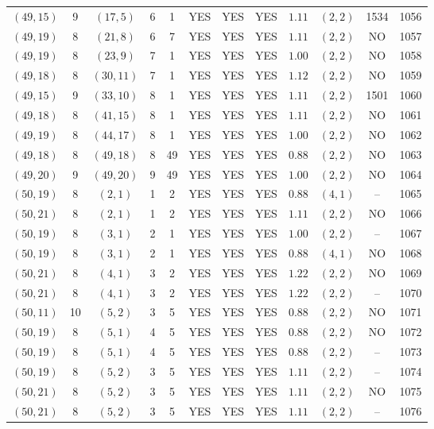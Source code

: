 \begin{longtable}{|c|c|c|c|c|c|c|c|c|c|c|c|}
$(49,15)$ & 9 & $(17,5)$ & 6 & 1 & YES & YES & YES & $1.11$ & $(2,2)$ & 1534 & 1056\\
$(49,19)$ & 8 & $(21,8)$ & 6 & 7 & YES & YES & YES & $1.11$ & $(2,2)$ & NO & 1057\\
$(49,19)$ & 8 & $(23,9)$ & 7 & 1 & YES & YES & YES & $1.00$ & $(2,2)$ & NO & 1058\\
$(49,18)$ & 8 & $(30,11)$ & 7 & 1 & YES & YES & YES & $1.12$ & $(2,2)$ & NO & 1059\\
$(49,15)$ & 9 & $(33,10)$ & 8 & 1 & YES & YES & YES & $1.11$ & $(2,2)$ & 1501 & 1060\\
$(49,18)$ & 8 & $(41,15)$ & 8 & 1 & YES & YES & YES & $1.11$ & $(2,2)$ & NO & 1061\\
$(49,19)$ & 8 & $(44,17)$ & 8 & 1 & YES & YES & YES & $1.00$ & $(2,2)$ & NO & 1062\\
$(49,18)$ & 8 & $(49,18)$ & 8 & 49 & YES & YES & YES & $0.88$ & $(2,2)$ & NO & 1063\\
$(49,20)$ & 9 & $(49,20)$ & 9 & 49 & YES & YES & YES & $1.00$ & $(2,2)$ & NO & 1064\\
$(50,19)$ & 8 & $(2,1)$ & 1 & 2 & YES & YES & YES & $0.88$ & $(4,1)$ & -- & 1065\\
$(50,21)$ & 8 & $(2,1)$ & 1 & 2 & YES & YES & YES & $1.11$ & $(2,2)$ & NO & 1066\\
$(50,19)$ & 8 & $(3,1)$ & 2 & 1 & YES & YES & YES & $1.00$ & $(2,2)$ & -- & 1067\\
$(50,19)$ & 8 & $(3,1)$ & 2 & 1 & YES & YES & YES & $0.88$ & $(4,1)$ & NO & 1068\\
$(50,21)$ & 8 & $(4,1)$ & 3 & 2 & YES & YES & YES & $1.22$ & $(2,2)$ & NO & 1069\\
$(50,21)$ & 8 & $(4,1)$ & 3 & 2 & YES & YES & YES & $1.22$ & $(2,2)$ & -- & 1070\\
$(50,11)$ & 10 & $(5,2)$ & 3 & 5 & YES & YES & YES & $0.88$ & $(2,2)$ & NO & 1071\\
$(50,19)$ & 8 & $(5,1)$ & 4 & 5 & YES & YES & YES & $0.88$ & $(2,2)$ & NO & 1072\\
$(50,19)$ & 8 & $(5,1)$ & 4 & 5 & YES & YES & YES & $0.88$ & $(2,2)$ & -- & 1073\\
$(50,19)$ & 8 & $(5,2)$ & 3 & 5 & YES & YES & YES & $1.11$ & $(2,2)$ & -- & 1074\\
$(50,21)$ & 8 & $(5,2)$ & 3 & 5 & YES & YES & YES & $1.11$ & $(2,2)$ & NO & 1075\\
$(50,21)$ & 8 & $(5,2)$ & 3 & 5 & YES & YES & YES & $1.11$ & $(2,2)$ & -- & 1076\\

\end{longtable}
